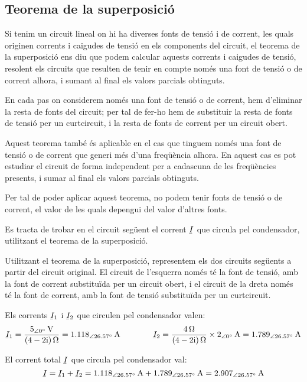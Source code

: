 \subsection{Teorema de la superposició}

Si tenim un circuit lineal on hi ha diverses fonts de tensió i  de
corrent, les quals originen corrents i caigudes de tensió en els
components del circuit, el teorema de la superposició ens diu que
podem calcular aquests corrents i caigudes de tensió, resolent els
circuits que resulten de tenir en compte  només una font de tensió o
de corrent alhora, i sumant al final els valors parcials
obtinguts.

En cada pas on considerem només una font de tensió o de corrent, hem
d'eliminar la resta de fonts del circuit; per tal de fer-ho hem de
substituir la resta de fonts de tensió per un curtcircuit, i la
resta de fonts de corrent per un circuit obert.

Aquest teorema també és aplicable en el cas que tinguem només una
font de tensió o de corrent que generi més d'una freqüència alhora. En aquest cas es pot estudiar el circuit de forma
independent per a cadascuna de les freqüències presents, i sumar al final els valors parcials obtinguts.

Per tal de poder aplicar aquest teorema, no podem tenir fonts de tensió o de corrent, el valor de les quals depengui del valor d'altres fonts.
\pagebreak
\begin{exemple}\label{ex:Superposicio}
	\addcontentsxms{\Superposicio}
    Es tracta de trobar en el circuit següent el corrent $\cmplx{I}$ que circula
    pel condensador, utilitzant el teorema de la superposició.
    \begin{center}
        
    \end{center}

    Utilitzant el teorema de la superposició, representem els dos
    circuits següents a partir del circuit original. El circuit de
    l'esquerra només té la font de tensió, amb la font de corrent substituïda per un circuit obert, i el circuit de
    la dreta només té la font de corrent, amb la font de tensió
    substituïda per un curtcircuit.
    \begin{center}
        
    \end{center}

    Els corrents $\cmplx{I}_1$ i $\cmplx{I}_2$ que circulen pel condensador valen:
    \[
        \cmplx{I}_1 = \frac{\qtypd{5}{0}{V}}{\complexqty{4-2j}{\ohm}} =
        \qtypd{1,118}{26,57}{A} \qquad\qquad
        \cmplx{I}_2 = \frac{\qty{4}{\ohm}}{\complexqty{4-2j}{ \ohm}} \times \qtypd{2}{0}{A} = \qtypd{1,789}{26,57}{A}
    \]

    El corrent total $\cmplx{I}$ que circula pel condensador val:
    \[
        \cmplx{I}  = \cmplx{I}_1 + \cmplx{I}_2 = \qtypd{1,118}{26,57}{A} +  \qtypd{1,789}{26,57}{A} =
        \qtypd{2,907}{26,57}{A}
    \]
\end{exemple}



